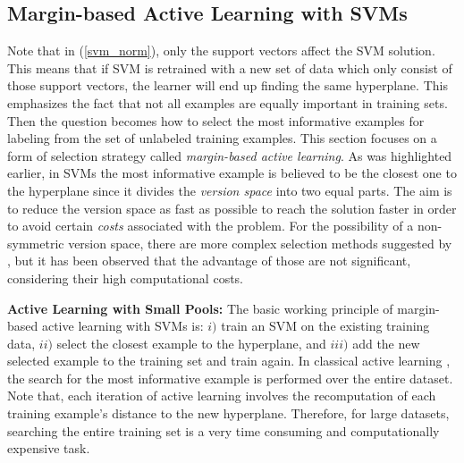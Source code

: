 \subsection{Margin-based Active Learning with SVMs}
\label{ALpools}
Note that in (\ref{svm_norm}), only the support vectors affect the SVM solution. This means that if SVM is retrained with a new set of data which only consist of those support vectors, the learner will end up finding the same hyperplane. This emphasizes the fact that not all examples are equally important in training sets. Then the question becomes how to select the most informative examples for labeling from the set of unlabeled training examples. This section focuses on a form of selection strategy called \textit{margin-based active learning}. As was highlighted earlier, in SVMs the most informative example is believed to be the closest one to the hyperplane since it divides the \textit{version space} into two equal parts. The aim is to reduce the version space as fast as possible to reach the solution faster in order to avoid certain \textit{costs} associated with the problem. For the possibility of a non-symmetric version space, there are more complex selection methods suggested by \cite{tong02svm}, but it has been observed that the advantage of those are not significant, considering their high computational costs.

\textbf{Active Learning with Small Pools:}
 The basic working principle of margin-based active learning with SVMs is: $i)$ train an SVM on the existing training data, $ii)$ select the closest example to the hyperplane, and $iii)$ add the new selected example to the training set and train again. In classical active learning \cite{tong02svm}, the search for the most informative example is performed over the entire dataset. Note that, each iteration of active learning involves the recomputation of each training example's distance to the new hyperplane. Therefore, for large datasets, searching the entire training set is a very time consuming and computationally expensive task.

